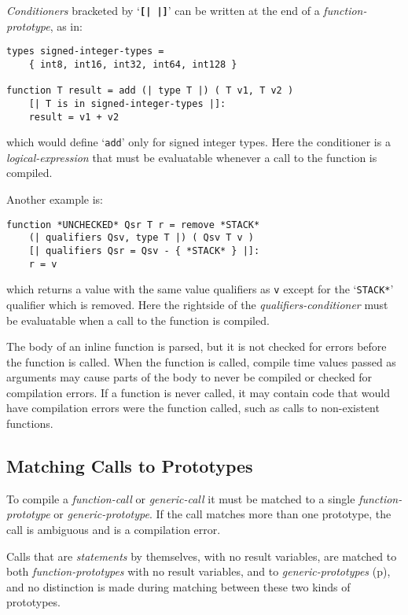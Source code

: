 \documentclass[12pt]{article}
\newcommand{\TT}[1]{{\tt \bfseries #1}}
\newcommand{\pagref}[1]{p\pageref{#1}}
\newenvironment{indpar}[1][0.3in]%
	{\begin{list}{}%
		     {\setlength{\itemsep}{0in}%
		      \setlength{\topsep}{0in}%
		      \setlength{\parsep}{1ex}%
		      \setlength{\labelwidth}{#1}%
		      \setlength{\leftmargin}{#1}%
		      \addtolength{\leftmargin}{\labelsep}}%
	 \item}%
	{\end{list}}
\begin{document}
{\em Conditioners} bracketed by `\TT{[|\,|]}'
can be written at the end of a {\em function-prototype},
as in:
\begin{indpar}\begin{verbatim}
types signed-integer-types =
    { int8, int16, int32, int64, int128 }

function T result = add (| type T |) ( T v1, T v2 )
    [| T is in signed-integer-types |]:
    result = v1 + v2
\end{verbatim}\end{indpar}

which would define `{\tt add}' only for signed integer types.
Here the conditioner is a {\em logical-ex\-pres\-sion} that must
be evaluatable whenever a call to the function is compiled.

Another example is:
\begin{indpar}\begin{verbatim}
function *UNCHECKED* Qsr T r = remove *STACK*
    (| qualifiers Qsv, type T |) ( Qsv T v )
    [| qualifiers Qsr = Qsv - { *STACK* } |]:
    r = v
\end{verbatim}\end{indpar}

which returns a value with the same value qualifiers as {\tt v}
except for the `{\tt *STACK*}' qualifier which is removed.
Here the rightside of the {\em qualifiers-conditioner}
must be evaluatable when a call to the function is compiled.

The body of an inline function is parsed, but it is not checked for
errors before the function is called.  When the function is called,
compile time values passed as arguments may cause parts of the body
to never be compiled or checked for compilation errors.  If a function
is never called, it may contain code that would have compilation errors
were the function called, such as calls to non-existent functions.

\subsection{Matching Calls to Prototypes}
\label{MATCHING-CALLS-TO-PROTOTYPES}

To compile a {\em function-call}
or {\em generic-call} it must be matched to a
single {\em function-prototype} or {\em generic-prototype}.
If the call matches more than one
prototype, the call is ambiguous and is a compilation error.

Calls that are {\em statements} by themselves, with no
result variables, are matched to both {\em function-prototypes}
with no result variables, and to
{\em generic-prototypes} (\pagref{GENERIC-PROTOTYPE}),
and no distinction is made during
matching between these two kinds of prototypes.
\end{document}
